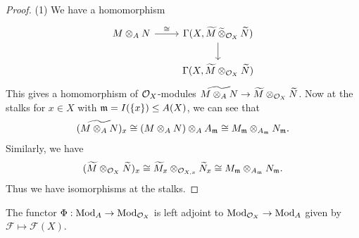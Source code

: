 \begin{proof}
  (1) We have a homomorphism
  \[
    \begin{tikzcd}
    M \otimes_A N
    \ar[r, "\cong"]
    &
    \Gamma(X, \widetilde{M}\, \widetilde{\otimes}_{\OO_X}\, \widetilde{N}) \ar[d] \\
    & \Gamma(X, \widetilde{M} \otimes_{\OO_X} \widetilde{N})
    \end{tikzcd}
  \]
  This gives a homomorphism
  of $\mathcal{O}_X$-modules
  $\widetilde{M \otimes_A N} \to \widetilde{M} \otimes_{\mathcal{O}_X} \widetilde{N}$.
  Now at the stalks for
  $x \in X$ with $\mathfrak{m} = I(\{x\}) \le A(X)$,
  we can see that
  \[
    (\widetilde{M \otimes_A N})_x
    \cong (M \otimes_A N) \otimes_A A_{\mathfrak{m}}
    \cong M_{\mathfrak{m}} \otimes_{A_{\mathfrak{m}}} N_{\mathfrak{m}}.
  \]
  Similarly, we have
  \[
    (\widetilde{M} \otimes_{\mathcal{O}_X} \widetilde{N})_x
    \cong \widetilde{M}_x \otimes_{\mathcal{O}_{X, x}} \widetilde{N}_x
    \cong M_{\mathfrak{m}} \otimes_{A_{\mathfrak{m}}} N_{\mathfrak{m}}.
  \]
  Thus we have isomorphisms
  at the stalks.
\end{proof}

\begin{remark}
  The functor $\Phi : \mathrm{Mod}_A \to \mathrm{Mod}_{\mathcal{O}_X}$
  is left adjoint to
  $\mathrm{Mod}_{\mathcal{O}_X} \to \mathrm{Mod}_A$
  given by $\mathcal{F} \mapsto \mathcal{F}(X)$.
\end{remark}
